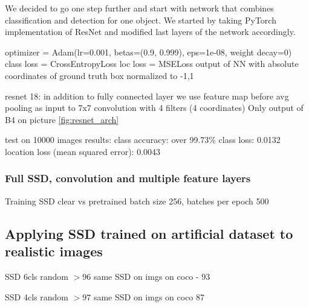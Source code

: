 We decided  to go one step further and start with network that combines classification and detection for one object. We started by taking PyTorch implementation of ResNet and modified last layers of the network accordingly. 


optimizer = Adam(lr=0.001, betas=(0.9, 0.999), eps=1e-08, weight decay=0)
class loss = CrossEntropyLoss
loc loss = MSELoss output of NN with absolute coordinates of ground truth box normalized to -1,1 

resnet 18: in addition to fully connected layer we use feature map before avg pooling as input to 7x7 convolution with 4 filters (4 coordinates) Only output of B4 on picture \cref{fig:resnet_arch} 

test on 10000 images
results: class accuracy: over 99.73\%
class loss: 0.0132
location loss (mean squared error): 0.0043



\subsubsection{Full SSD, convolution and multiple feature layers}
Training SSD clear vs pretrained
batch size 256, batches per epoch 500




\subsection{Applying SSD trained on artificial dataset to realistic images}
SSD 6cls random $>96$
same SSD on imgs on coco - 93

SSD 4cls random $>97$
same SSD on imgs on coco 87